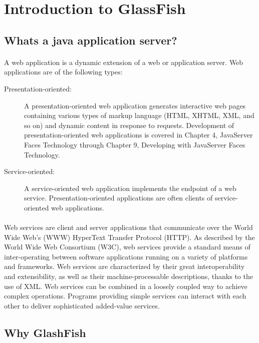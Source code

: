 \section{Introduction to GlassFish}
\subsection{Whats a java application server?}
\paragraph{}
A web application is a dynamic extension of a web or application server. Web applications are of the following types:

\begin{description}
\item[Presentation-oriented:] A presentation-oriented web application generates interactive web pages containing various types of markup language (HTML, XHTML, XML, and so on) and dynamic content in response to requests. Development of presentation-oriented web applications is covered in Chapter 4, JavaServer Faces Technology through Chapter 9, Developing with JavaServer Faces Technology.

\item[Service-oriented:] A service-oriented web application implements the endpoint of a web service. Presentation-oriented applications are often clients of service-oriented web applications. 
\end{description}

\paragraph{}
Web services are client and server applications that communicate over the World Wide Web’s (WWW) HyperText Transfer Protocol (HTTP). As described by the World Wide Web Consortium (W3C), web services provide a standard means of inter-operating between software applications running on a variety of platforms and frameworks. Web services are characterized by their great interoperability and extensibility, as well as their machine-processable descriptions, thanks to the use of XML. Web services can be combined in a loosely coupled way to achieve complex operations. Programs providing simple services can interact with each other to deliver sophisticated added-value services.

\subsection{Why GlashFish}
